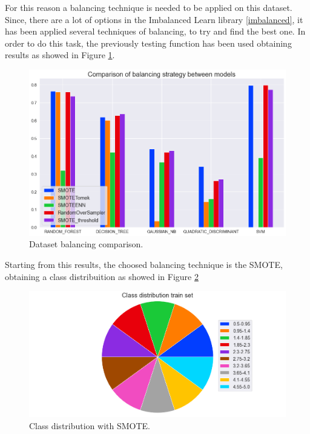 \documentclass[../main]{subfiles}
\begin{document}
For this reason a balancing technique is needed to be applied on this dataset. Since, there are a lot of options in the Imbalanced Learn library \ref{imbalanced}, it has been applied several techniques of balancing, to try and find the best one.
In order to do this task, the previously testing function has been used obtaining results as showed in Figure \ref{fig:balance_evaluation}.

\begin{figure}[h]
    \begin{center}
        \includegraphics[width=0.7\linewidth]{figures/imbalance_evaluation.png}
    \end{center}
    
    \caption{Dataset balancing comparison.}
    \label{fig:balance_evaluation}

\end{figure}
\newpage
Starting from this results, the choosed balancing technique is the SMOTE, obtaining a class distribuition as showed in Figure \ref{fig:class_distribuition_balance}

\begin{figure}[h]
    \begin{center}
        \includegraphics[width=0.5\linewidth]{figures/class_distribution_smote.png}
    \end{center}
    
    \caption{Class distribution  with SMOTE.}
    \label{fig:class_distribuition_balance}
\end{figure}
\end{document}
